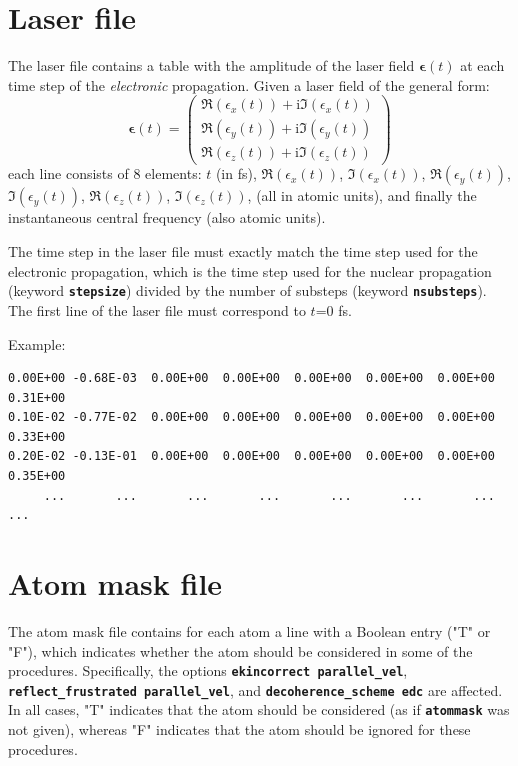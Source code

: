\documentclass[a4paper,10pt,DIV=15,openany,twoside=false]{scrbook}
\newcommand{\ttt}[1]{\textbf{\texttt{#1}}}
\newcommand{\I}{\ensuremath{\mathrm{i}}}
\newenvironment{example}{
  \setlength{\OuterFrameSep}{3pt}
  \vspace{0mm}
  \definecolor{shadecolor}{HTML}{E4F4FF}
  \begin{shaded}
}{
  \end{shaded}
}
\begin{document}
\section{Laser file}\label{sec:laserfile}

The laser file contains a table with the amplitude of the laser field $\boldsymbol{\epsilon}(t)$ at each time step of the \textit{electronic} propagation. Given a laser field of the general form:
\begin{equation}
  \boldsymbol{\epsilon}(t)=
  \begin{pmatrix}
    \Re(\epsilon_x(t))+\I \Im(\epsilon_x(t))\\
    \Re(\epsilon_y(t))+\I \Im(\epsilon_y(t))\\
    \Re(\epsilon_z(t))+\I \Im(\epsilon_z(t))
  \end{pmatrix}
\end{equation}
each line consists of 8 elements: $t$ (in fs), $\Re(\epsilon_x(t))$, $\Im(\epsilon_x(t))$, $\Re(\epsilon_y(t))$, $\Im(\epsilon_y(t))$, $\Re(\epsilon_z(t))$, $\Im(\epsilon_z(t))$, (all in atomic units), and finally the instantaneous central frequency (also atomic units).

The time step in the laser file must exactly match the time step used for the electronic propagation, which is the time step used for the nuclear propagation (keyword \ttt{stepsize}) divided by the number of substeps (keyword \ttt{nsubsteps}). The first line of the laser file must correspond to $t$=0 fs.

Example:
\begin{example}
\begin{verbatim}
0.00E+00 -0.68E-03  0.00E+00  0.00E+00  0.00E+00  0.00E+00  0.00E+00  0.31E+00
0.10E-02 -0.77E-02  0.00E+00  0.00E+00  0.00E+00  0.00E+00  0.00E+00  0.33E+00
0.20E-02 -0.13E-01  0.00E+00  0.00E+00  0.00E+00  0.00E+00  0.00E+00  0.35E+00
     ...       ...       ...       ...       ...       ...       ...       ...
\end{verbatim}
\end{example}

\section{Atom mask file}\label{sec:atommaskfile}

The atom mask file contains for each atom a line with a Boolean entry ("T" or "F"), which indicates whether the atom should be considered in some of the procedures. Specifically, the options \ttt{ekincorrect parallel\_vel}, \ttt{reflect\_frustrated parallel\_vel}, and \ttt{decoherence\_scheme edc} are affected.
In all cases, "T" indicates that the atom should be considered (as if \ttt{atommask} was not given), whereas "F" indicates that the atom should be ignored for these procedures.
\end{document}
